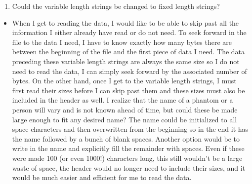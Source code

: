 \documentclass{article}
\begin{document}
\begin{enumerate}[label = (\arabic*), leftmargin = 0.0cm, resume = section]
\bfseries
\item Could the variable length strings be changed to fixed length strings?  
\end{enumerate}
\begin{itemize}
    \item When I get to reading the data, I would like to be able to skip past all the information I either already have read or do not need.  To seek forward in the file to the data I need, I have to know exactly how many bytes there are between the beginning of the file and the first piece of data I need.  The data preceding these variable length strings are always the same size so I do not need to read the data, I can simply seek forward by the associated number of bytes.  On the other hand, once I get to the variable length strings, I must first read their sizes before I can skip past them and these sizes must also be included in the header as well.  I realize that the name of a phantom or a person will vary and is not known ahead of time, but could these be made large enough to fit any desired name?  The name could be initialized to all space characters and then overwritten from the beginning so in the end it has the name followed by a bunch of blank spaces.  Another option would be to write in the name and explicitly fill the remainder with spaces.  Even if these were made 100 (or even 1000!) characters long, this still wouldn't be a large waste of space, the header would no longer need to include their sizes, and it would be much easier and efficient for me to read the data.
\end{itemize}
\end{document}

